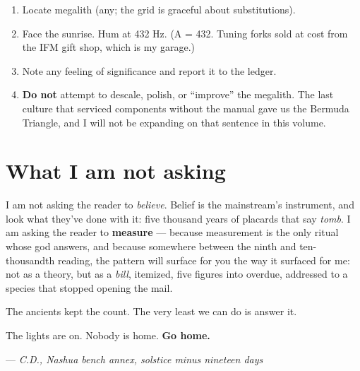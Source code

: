 \documentclass[
  english,
  11pt,
  letterpaper,
]{scrbook}
\providecommand{\tightlist}{%
  \setlength{\itemsep}{0pt}\setlength{\parskip}{0pt}}
\begin{document}
\begin{tcolorbox}[enhanced jigsaw, arc=.35mm, bottomrule=.15mm, bottomtitle=1mm, breakable, colback=white, colbacktitle=quarto-callout-tip-color!10!white, colframe=quarto-callout-tip-color-frame, coltitle=black, left=2mm, leftrule=.75mm, opacityback=0, opacitybacktitle=0.6, rightrule=.15mm, title=\textcolor{quarto-callout-tip-color}{\faLightbulb}\hspace{0.5em}{Field procedure for the solstice}, titlerule=0mm, toprule=.15mm, toptitle=1mm]

\begin{enumerate}
\def\labelenumi{\arabic{enumi}.}
\tightlist
\item
  Locate megalith (any; the grid is graceful about substitutions).
\item
  Face the sunrise. Hum at 432 Hz. (A = 432. Tuning forks sold at cost
  from the IFM gift shop, which is my garage.)
\item
  Note any feeling of significance and report it to the ledger.
\item
  \textbf{Do not} attempt to descale, polish, or ``improve'' the
  megalith. The last culture that serviced components without the manual
  gave us the Bermuda Triangle, and I will not be expanding on that
  sentence in this volume.
\end{enumerate}

\end{tcolorbox}

\section{What I am not asking}\label{what-i-am-not-asking}

I am not asking the reader to \emph{believe}. Belief is the mainstream's
instrument, and look what they've done with it: five thousand years of
placards that say \emph{tomb}. I am asking the reader to
\textbf{measure} --- because measurement is the only ritual whose god
answers, and because somewhere between the ninth and ten-thousandth
reading, the pattern will surface for you the way it surfaced for me:
not as a theory, but as a \emph{bill}, itemized, five figures into
overdue, addressed to a species that stopped opening the mail.

The ancients kept the count. The very least we can do is answer it.

The lights are on. Nobody is home. \textbf{Go home.}

--- \emph{C.D., Nashua bench annex, solstice minus nineteen days}
\end{document}
